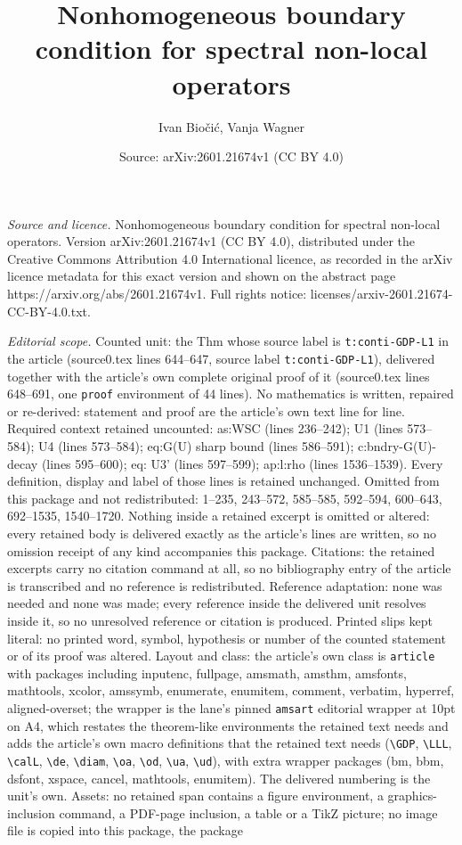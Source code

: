 \documentclass[10pt,a4paper]{amsart}
\title[Nonhomogeneous boundary condition for spectral non-local ope]{Nonhomogeneous boundary condition for spectral non-local operators}
\author{Ivan Bio\v{c}i\'c, Vanja Wagner}
\date{Source: arXiv:2601.21674v1 (CC BY 4.0)}
\begin{document}
\maketitle

\noindent\emph{Source and licence.} Nonhomogeneous boundary condition for spectral non-local operators. Version arXiv:2601.21674v1 (CC BY 4.0), distributed under the Creative Commons Attribution 4.0 International licence, as recorded in the arXiv licence metadata for this exact version and shown on the abstract page https://arxiv.org/abs/2601.21674v1. Full rights notice: licenses/arxiv-2601.21674-CC-BY-4.0.txt.\par\smallskip

\noindent\textit{Editorial scope.} Counted unit: the Thm whose source label is \texttt{t:conti-GDP-L1} in the article (source0.tex lines 644--647, source label \texttt{t:conti-GDP-L1}), delivered together with the article's own complete original proof of it (source0.tex lines 648--691, one \texttt{proof} environment of 44 lines). No mathematics is written, repaired or re-derived: statement and proof are the article's own text line for line. Required context retained uncounted: as:WSC (lines 236--242); U1 (lines 573--584); U4 (lines 573--584); eq:G(U) sharp bound (lines 586--591); c:bndry-G(U)-decay (lines 595--600); eq: U3' (lines 597--599); ap:l:rho (lines 1536--1539). Every definition, display and label of those lines is retained unchanged. Omitted from this package and not redistributed: 1--235, 243--572, 585--585, 592--594, 600--643, 692--1535, 1540--1720. Nothing inside a retained excerpt is omitted or altered: every retained body is delivered exactly as the article's lines are written, so no omission receipt of any kind accompanies this package. Citations: the retained excerpts carry no citation command at all, so no bibliography entry of the article is transcribed and no reference is redistributed. Reference adaptation: none was needed and none was made; every reference inside the delivered unit resolves inside it, so no unresolved reference or citation is produced. Printed slips kept literal: no printed word, symbol, hypothesis or number of the counted statement or of its proof was altered. Layout and class: the article's own class is \texttt{article} with packages including inputenc, fullpage, amsmath, amsthm, amsfonts, mathtools, xcolor, amssymb, enumerate, enumitem, comment, verbatim, hyperref, aligned-overset; the wrapper is the lane's pinned \texttt{amsart} editorial wrapper at 10pt on A4, which restates the theorem-like environments the retained text needs and adds the article's own macro definitions that the retained text needs (\texttt{\textbackslash GDP}, \texttt{\textbackslash LLL}, \texttt{\textbackslash calL}, \texttt{\textbackslash de}, \texttt{\textbackslash diam}, \texttt{\textbackslash oa}, \texttt{\textbackslash od}, \texttt{\textbackslash ua}, \texttt{\textbackslash ud}), with extra wrapper packages (bm, bbm, dsfont, xspace, cancel, mathtools, enumitem). The delivered numbering is the unit's own. Assets: no retained span contains a figure environment, a graphics-inclusion command, a PDF-page inclusion, a table or a TikZ picture; no image file is copied into this package, the package 
\end{document}
